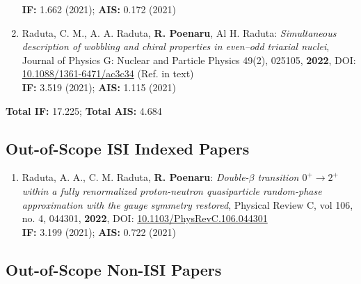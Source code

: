 \begin{enumerate}
    \textbf{IF:} 1.662 (2021); \textbf{AIS:} 0.172 (2021)
    \item Raduta, C. M., A. A. Raduta, \textbf{R. Poenaru}, Al H. Raduta: \emph{Simultaneous description of wobbling and chiral properties in even–odd triaxial nuclei}, Journal of Physics G: Nuclear and Particle Physics 49(2), 025105, \textbf{2022}, DOI: \href{https://iopscience.iop.org/article/10.1088/1361-6471/ac3c34/meta}{10.1088/1361-6471/ac3c34} (Ref. \cite{raduta2022simultaneous} in text) \\
    \textbf{IF:} 3.519 (2021); \textbf{AIS:} 1.115 (2021)
\end{enumerate}

\textbf{Total IF:} 17.225; \textbf{Total AIS:} 4.684 

\subsection{Out-of-Scope ISI Indexed Papers}

\begin{enumerate}
    \item Raduta, A. A., C. M. Raduta, \textbf{R. Poenaru}: \emph{Double-$\beta$ transition $0^+\to2^+$ within a fully renormalized proton-neutron quasiparticle random-phase approximation with the gauge symmetry restored}, Physical Review C, vol 106, no. 4, 044301, \textbf{2022}, DOI: \href{https://journals.aps.org/prc/abstract/10.1103/PhysRevC.106.044301}{10.1103/PhysRevC.106.044301} \\
    \textbf{IF:} 3.199 (2021); \textbf{AIS:} 0.722 (2021)
\end{enumerate}

\subsection{Out-of-Scope Non-ISI Papers}

